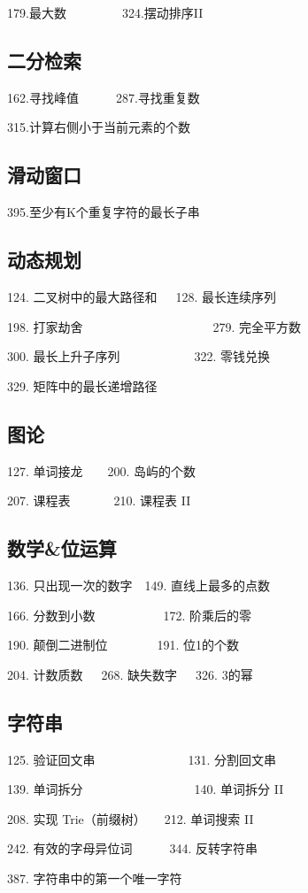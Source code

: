 \documentclass[twocolumn, a4paper, 11pt]{article}
\begin{document}
	179.最大数~~~~~~~~~324.摆动排序II
	
	\subsection{二分检索}
	
	162.寻找峰值~~~~~~287.寻找重复数
	
	315.计算右侧小于当前元素的个数
	
	\subsection{滑动窗口}
	
	395.至少有K个重复字符的最长子串
	
	\subsection{动态规划}
	
	124. 二叉树中的最大路径和~~~128. 最长连续序列

	198. 打家劫舍~~~~~~~~~~~~~~~~~~~~~279. 完全平方数
	
	300. 最长上升子序列~~~~~~~~~~~~322. 零钱兑换
	
	329. 矩阵中的最长递增路径
	
	\subsection{图论}
	
	127. 单词接龙~~~~200. 岛屿的个数
	
	207. 课程表~~~~~~~210. 课程表 II
	
	\subsection{数学\&位运算}
	
	136. 只出现一次的数字~~149. 直线上最多的点数
	
	166. 分数到小数~~~~~~~~~~~172. 阶乘后的零
	
	190. 颠倒二进制位~~~~~~~~191. 位1的个数
	
	204. 计数质数~~~268. 缺失数字~~~326. 3的幂
	
	\subsection{字符串}
	
	125. 验证回文串~~~~~~~~~~~~~~~131. 分割回文串
	
	139. 单词拆分~~~~~~~~~~~~~~~~~~140. 单词拆分 II
	
	208. 实现 Trie（前缀树）~~~212. 单词搜索 II
	
	242. 有效的字母异位词~~~~~~344. 反转字符串
	
	387. 字符串中的第一个唯一字符
	
\end{document}

